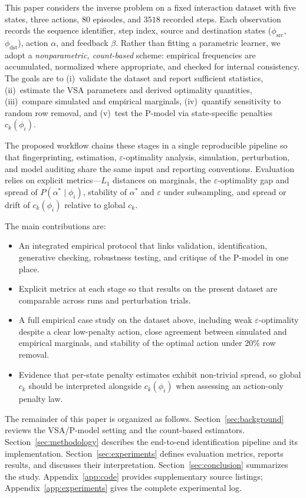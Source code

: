 \documentclass[11pt,a4paper]{article}
\begin{document}
This paper considers the inverse problem on a fixed interaction dataset with five
states, three actions, $80$ episodes, and $3518$ recorded steps. Each observation
records the sequence identifier, step index, source and destination states
($\phi_{\mathrm{src}}$, $\phi_{\mathrm{dst}}$), action $\alpha$, and feedback
$\beta$. Rather than fitting a parametric learner, we adopt a
\emph{nonparametric, count-based} scheme: empirical frequencies are accumulated,
normalized where appropriate, and checked for internal consistency. The goals are
to (i)~validate the dataset and report sufficient statistics, (ii)~estimate the
VSA parameters and derived optimality quantities, (iii)~compare simulated and
empirical marginals, (iv)~quantify sensitivity to random row removal, and
(v)~test the P-model via state-specific penalties $c_k(\phi_i)$.

The proposed workflow chains these stages in a single reproducible pipeline so that
fingerprinting, estimation, $\varepsilon$-optimality analysis, simulation,
perturbation, and model auditing share the same input and reporting conventions.
Evaluation relies on explicit metrics---$L_1$ distances on marginals, the
$\varepsilon$-optimality gap and spread of $P(\alpha^\ast\mid\phi_i)$, stability
of $\alpha^\ast$ and $\varepsilon$ under subsampling, and spread or drift of
$c_k(\phi_i)$ relative to global $c_k$.

The main contributions are:
\begin{itemize}[noitemsep]
  \item An integrated empirical protocol that links validation, identification,
        generative checking, robustness testing, and critique of the P-model in
        one place.
  \item Explicit metrics at each stage so that results on the present dataset are
        comparable across runs and perturbation trials.
  \item A full empirical case study on the dataset above, including weak
        $\varepsilon$-optimality despite a clear low-penalty action, close agreement
        between simulated and empirical marginals, and stability of the optimal
        action under $20\%$ row removal.
  \item Evidence that per-state penalty estimates exhibit non-trivial spread, so
        global $c_k$ should be interpreted alongside $c_k(\phi_i)$ when assessing
        an action-only penalty law.
\end{itemize}

The remainder of this paper is organized as follows.
Section~\ref{sec:background} reviews the VSA/P-model setting and the count-based
estimators.
Section~\ref{sec:methodology} describes the end-to-end identification pipeline
and its implementation.
Section~\ref{sec:experiments} defines evaluation metrics, reports results, and
discusses their interpretation.
Section~\ref{sec:conclusion} summarizes the study.
Appendix~\ref{app:code} provides supplementary source listings; Appendix~\ref{app:experiments}
gives the complete experimental log.
\end{document}
